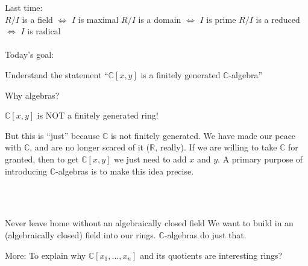 \documentclass{beamer}
\newcommand{\C}{\mathbb{C}}
\newcommand{\R}{\mathbb{R}}
\begin{document}
\begin{frame}[plain, c]

\huge
\begin{center}
{ Last time: \\}
$R/I$ is a field $\iff$ $I$ is maximal
$R/I$ is a domain $\iff$ $I$ is prime
$R/I$ is a reduced $\iff$ $I$ is radical \\~\\
  

{ Today's goal: \\}

Understand the statement ``$\C[x,y]$ is a finitely generated $\C$-algebra''

\end{center}
\end{frame}



\begin{frame}{Why algebras?}

\begin{block}{$\C[x,y]$ is \alert{NOT} a finitely generated ring!}


But this is ``just'' because $\C$ is not finitely generated.  We have made our peace with $\C$, and are no longer scared of it ($\R$, really).  If we are willing to take $\C$ for granted, then to get $\C[x,y]$ we just need to add $x$ and $y$. A primary purpose of introducing $\C$-algebras is to make this idea precise.  
\end{block}\\~\\
\begin{block}{Never leave home without an algebraically closed field} 
We want to build in an (algebraically closed) field into our rings. $\C$-algebras do just that.
\end{block}
\begin{block}{More:}
 To explain why $\C[x_1,\dots,x_n]$ and its quotients are interesting rings?
 \end{block}
\end{frame}
\end{document}

